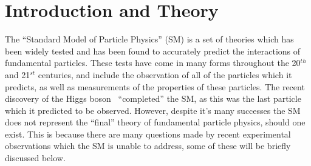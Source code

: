 
\chapter{Introduction and Theory} \label{chap:Theory} %

\graphicspath{{Theory/Figs/Raster/}{Theory/Figs/PDF/}{Theory/Figs/Vector/}}





The ``Standard Model of Particle Physics'' (SM) is a set of theories which has been widely tested and has been found to accurately predict the interactions of fundamental particles. These tests have come in many forms throughout the 20$^{th}$ and 21$^{st}$ centuries, and include the observation of all of the particles which it predicts, as well as measurements of the properties of these particles. The recent discovery of the Higgs boson~\citep{HiggsAtlas, HiggsCMS} ``completed'' the SM, as this was the last particle which it predicted to be observed. However, despite it's many successes the SM does not represent the ``final'' theory of fundamental particle physics, should one exist. This is because there are many questions made by recent experimental observations which the SM is unable to address, some of these will be briefly discussed below. \\

